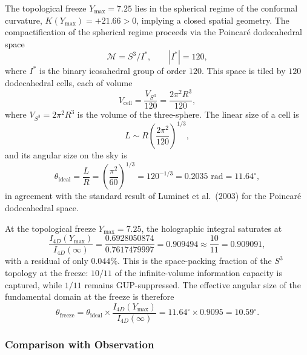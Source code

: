 \documentclass[a4paper,1pt,oneside,openany]{book}
\begin{document}
The topological freeze $Y_{\max} = 7.25$ lies in the spherical regime of the conformal curvature, $K(Y_{\max}) = +21.66 > 0$, implying a closed spatial geometry. The compactification of the spherical regime proceeds via the Poincar\'e dodecahedral space
\begin{equation}
\mathcal{M} = S^3 / I^*, \qquad |I^*| = 120,
\label{eq:poincare-coldspot}
\end{equation}
where $I^*$ is the binary icosahedral group of order $120$. This space is tiled by $120$ dodecahedral cells, each of volume
\begin{equation}
V_{\mathrm{cell}} = \frac{V_{S^3}}{120} = \frac{2\pi^2 R^3}{120},
\label{eq:cell-volume}
\end{equation}
where $V_{S^3} = 2\pi^2 R^3$ is the volume of the three-sphere. The linear size of a cell is
\begin{equation}
L \sim R \left(\frac{2\pi^2}{120}\right)^{1/3},
\label{eq:cell-size}
\end{equation}
and its angular size on the sky is
\begin{equation}
\theta_{\mathrm{ideal}} = \frac{L}{R} = \left(\frac{\pi^2}{60}\right)^{1/3} = 120^{-1/3} = 0.2035 \text{ rad} = 11.64^\circ,
\label{eq:theta-ideal}
\end{equation}
in agreement with the standard result of Luminet et al.\ (2003) for the Poincar\'e dodecahedral space.

At the topological freeze $Y_{\max} = 7.25$, the holographic integral saturates at
\begin{equation}
\frac{I_{4D}(Y_{\max})}{I_{4D}(\infty)} = \frac{0.6928050874}{0.7617479997} = 0.909494 \approx \frac{10}{11} = 0.909091,
\label{eq:packing-fraction}
\end{equation}
with a residual of only $0.044\%$. This is the space-packing fraction of the $S^3$ topology at the freeze: $10/11$ of the infinite-volume information capacity is captured, while $1/11$ remains GUP-suppressed. The effective angular size of the fundamental domain at the freeze is therefore
\begin{equation}
\boxed{\theta_{\mathrm{freeze}} = \theta_{\mathrm{ideal}} \times \frac{I_{4D}(Y_{\max})}{I_{4D}(\infty)} = 11.64^\circ \times 0.9095 = 10.59^\circ.}
\label{eq:theta-freeze}
\end{equation}

\subsubsection{Comparison with Observation}
\end{document}
